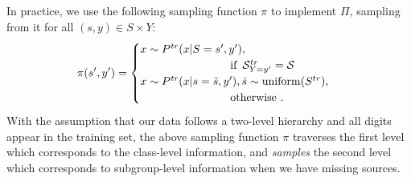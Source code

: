 In practice, we use the following sampling function $\pi$ to implement $\Pi$, sampling from it for
all $(s,y) \in S \times Y$:
%
\begin{align}
  \pi(s',y') = \begin{cases} x\sim P^\mathit{tr}(x|S=s',y'), \\
    \quad\quad\quad\quad\quad\quad\quad\quad\text{if }\,{\mathcal{S}}^{tr}_{Y=y'}={\mathcal{S}} \\
  x\sim P^\mathit{tr}(x|s=\check{s},y'), \check{s}\sim \mathrm{uniform}(S^{tr}), \\
    \quad\quad\quad\quad\quad\quad\quad\quad\text{otherwise}~.
\end{cases}
\label{eq:functional-sampling}
\end{align}
%
With the assumption that our data follows a two-level hierarchy and all digits appear in the
training set, the above sampling function $\pi$ traverses the first level which corresponds to the
class-level information, and \emph{samples} the second level which corresponds to subgroup-level
information when we have missing sources.
 


